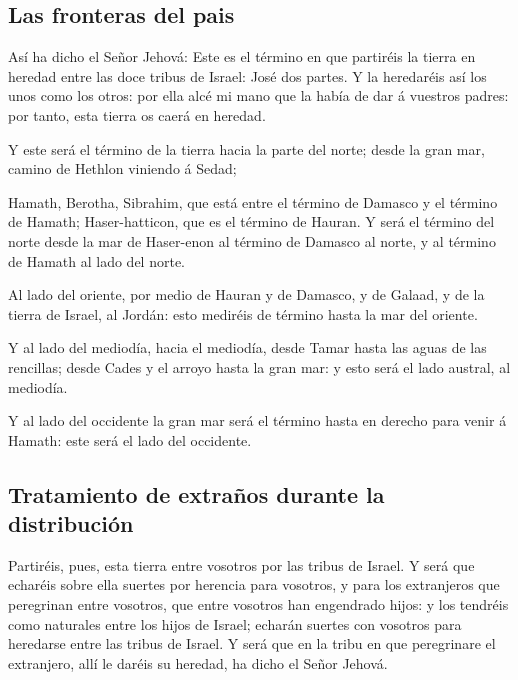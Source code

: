 \hypertarget{las-fronteras-del-pais}{%
\subsection{Las fronteras del pais}\label{las-fronteras-del-pais}}

 Así ha dicho el Señor Jehová: Este es el término en que
partiréis la tierra en heredad entre las doce tribus de Israel: José dos
partes.  Y la heredaréis así los unos como los otros: por
ella alcé mi mano que la había de dar á vuestros padres: por tanto, esta
tierra os caerá en heredad.

 Y este será el término de la tierra hacia la parte del
norte; desde la gran mar, camino de Hethlon viniendo á Sedad;

 Hamath, Berotha, Sibrahim, que está entre el término de
Damasco y el término de Hamath; Haser-hatticon, que es el término de
Hauran.  Y será el término del norte desde la mar de
Haser-enon al término de Damasco al norte, y al término de Hamath al
lado del norte.

 Al lado del oriente, por medio de Hauran y de Damasco, y
de Galaad, y de la tierra de Israel, al Jordán: esto mediréis de término
hasta la mar del oriente.

 Y al lado del mediodía, hacia el mediodía, desde Tamar
hasta las aguas de las rencillas; desde Cades y el arroyo hasta la gran
mar: y esto será el lado austral, al mediodía.

 Y al lado del occidente la gran mar será el término hasta
en derecho para venir á Hamath: este será el lado del occidente.

\hypertarget{tratamiento-de-extrauxf1os-durante-la-distribuciuxf3n}{%
\subsection{Tratamiento de extraños durante la
distribución}\label{tratamiento-de-extrauxf1os-durante-la-distribuciuxf3n}}

 Partiréis, pues, esta tierra entre vosotros por las tribus
de Israel.  Y será que echaréis sobre ella suertes por
herencia para vosotros, y para los extranjeros que peregrinan entre
vosotros, que entre vosotros han engendrado hijos: y los tendréis como
naturales entre los hijos de Israel; echarán suertes con vosotros para
heredarse entre las tribus de Israel.  Y será que en la
tribu en que peregrinare el extranjero, allí le daréis su heredad, ha
dicho el Señor Jehová.

